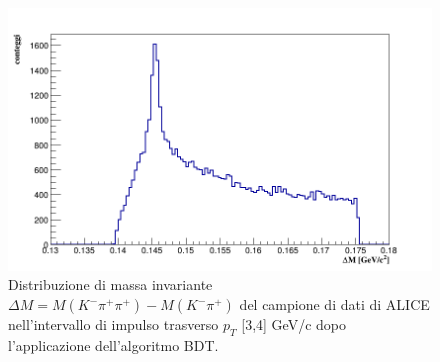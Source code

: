     \begin{figure}[htbp]
        \centering
        \includegraphics[width=0.8\linewidth]{AnalisiDati/diffDstarD0_3_4BDT.png}
        \caption{Distribuzione di massa invariante $\Delta M = M (K^- \pi^+ \pi^+) - M(K^- \pi^+)$ del campione di dati di ALICE nell'intervallo di impulso trasverso $p_T$ [3,4] GeV/c dopo l'applicazione dell'algoritmo BDT.}
        \label{fig:distribuzione_massa}
    \end{figure}



